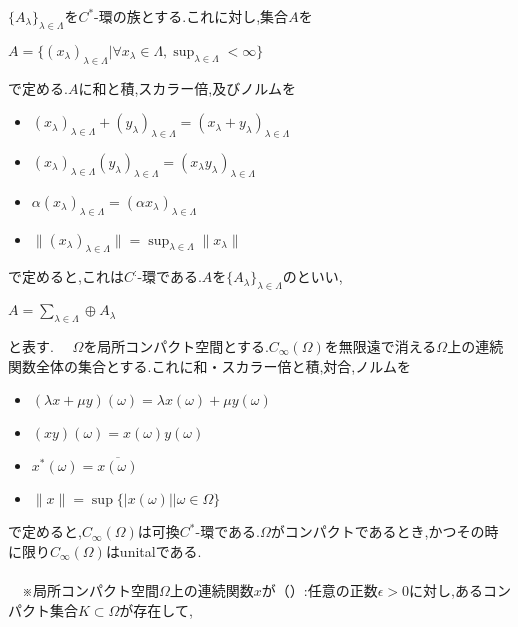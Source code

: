 $\{A_{\lambda}\}_{\lambda \in \Lambda}$を$C^*$-環の族とする.これに対し,集合$A$を
\begin{center}
$A=\{ \left( x_{\lambda}\right)_{\lambda \in \Lambda}|\forall x_{\lambda}\in \Lambda ,
\sup_{\lambda \in \Lambda}<\infty \}$
\end{center}
で定める.$A$に和と積,スカラー倍,及びノルムを
\begin{itemize}
\item $\left( x_{\lambda}\right)_{\lambda \in \Lambda}+\left( y_{\lambda}\right)_{\lambda \in \Lambda}
=\left( x_{\lambda}+y_{\lambda}\right)_{\lambda \in \Lambda}$
\item $\left( x_{\lambda}\right)_{\lambda \in \Lambda}\left( y_{\lambda}\right)_{\lambda \in \Lambda}
=\left( x_{\lambda}y_{\lambda}\right)_{\lambda \in \Lambda}$
\item $\alpha \left( x_{\lambda}\right)_{\lambda \in \Lambda}=\left( \alpha x_{\lambda}\right)_{\lambda \in \Lambda}$
\item $\parallel \left( x_{\lambda}\right)_{\lambda \in \Lambda}\parallel=\sup_{\lambda \in \Lambda}\parallel x_{\lambda}\parallel$
\end{itemize}
で定めると,これは$C^:$-環である.$A$を$\{A_{\lambda}\}_{\lambda \in \Lambda}$のといい,
\begin{center}
$A=\sum_{\lambda \in \Lambda} \oplus A_{\lambda}$
\end{center}
と表す.
　$\Omega$を局所コンパクト空間とする.$C_{\infty}\left( \Omega\right)$を無限遠で消える$\Omega$上の連続関数全体の集合とする.これに和・スカラー倍と積,対合,ノルムを
\begin{itemize}
\item $\left(\lambda x+\mu y\right)\left(\omega\right)=\lambda x\left(\omega\right)+\mu y\left(\omega\right)$
\item $\left(xy\right)\left(\omega\right)=x\left(\omega\right)y\left(\omega\right)$
\item $x^*\left(\omega\right)=\overline{x\left(\omega\right)}$
\item $\parallel x\parallel=\sup\{|x\left(\omega\right)||\omega \in \Omega\}$
\end{itemize}
で定めると,$C_{\infty}\left( \Omega\right)$は可換$C^*$-環である.$\Omega$がコンパクトであるとき,かつその時に限り$C_{\infty}\left( \Omega\right)$はunitalである.\\
\\
　※局所コンパクト空間$\Omega$上の連続関数$x$が（）:任意の正数$\epsilon >0$に対し,あるコンパクト集合$K\subset \Omega$が存在して,
